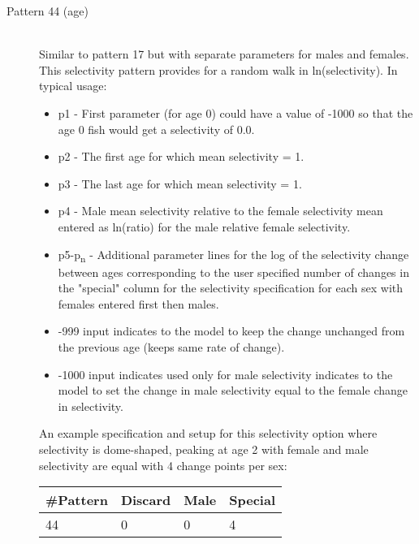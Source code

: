 \begin{description}
	\item[Pattern 44 (age)]\hfill\\
	Similar to pattern 17 but with separate parameters for males and females. This selectivity pattern provides for a random walk in ln(selectivity).  In typical usage:
	\begin{itemize}
		\item p1 - First parameter (for age 0) could have a value of -1000 so that the age 0 fish would get a selectivity of 0.0.
		\item p2 - The first age for which mean selectivity = 1.
		\item p3 - The last age for which mean selectivity = 1.
		\item p4 - Male mean selectivity relative to the female selectivity mean entered as ln(ratio) for the male relative female selectivity.
		\item p5-p\textsubscript{n} - Additional parameter lines for the log of the selectivity change between ages corresponding to the user specified number of changes in the "special" column for the selectivity specification for each sex with females entered first then males.
		\item -999 input indicates to the model to keep the change unchanged from the previous age (keeps same rate of change).
		\item -1000 input indicates used only for male selectivity indicates to the model to set the change in male selectivity equal to the female change in selectivity.
	\end{itemize}
	An example specification and setup for this selectivity option where selectivity is dome-shaped, peaking at age 2 with female and male selectivity are equal with 4 change points per sex:
	\begin{center}
		\begin{longtable}{p{1.5cm} p{1.5cm} p{1.5cm} p{1.5cm} }
			\hline
			\#Pattern & Discard & Male & Special\\
			\hline
			44 & 0 & 0 & 4 \\
			\hline
		\end{longtable}
	\end{center}


\end{description}
